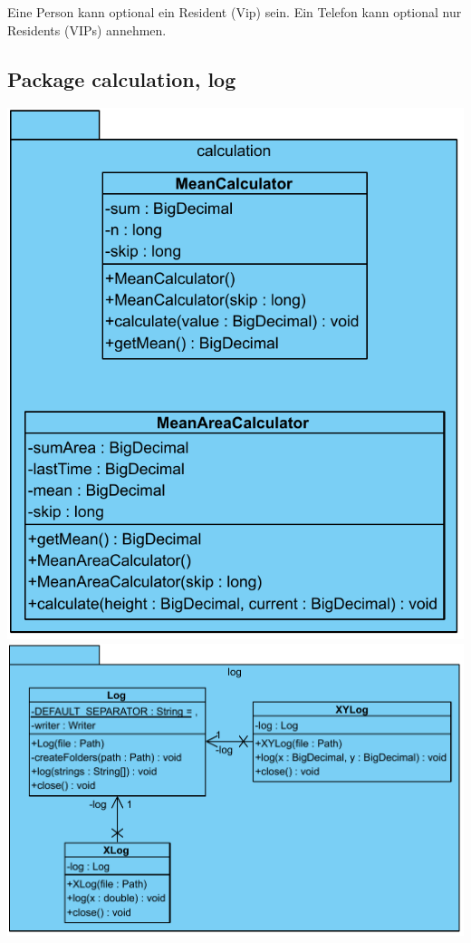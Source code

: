Eine Person kann optional ein Resident (Vip) sein. Ein Telefon kann optional nur Residents (VIPs) annehmen.

\subsection{Package calculation, log}

\includegraphics[scale=0.5]{abbildungen/uml/calculation.pdf}
\includegraphics[scale=0.5]{abbildungen/uml/log.pdf}

